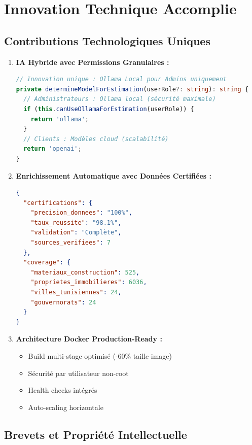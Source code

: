 \section{Innovation Technique Accomplie}

\subsection{Contributions Technologiques Uniques}

\begin{enumerate}
    \item \textbf{IA Hybride avec Permissions Granulaires :}
    \begin{lstlisting}[language=TypeScript, caption=Innovation : Contrôle d'accès IA par rôle]
// Innovation unique : Ollama Local pour Admins uniquement
private determineModelForEstimation(userRole?: string): string {
  // Administrateurs : Ollama local (sécurité maximale)
  if (this.canUseOllamaForEstimation(userRole)) {
    return 'ollama';
  }
  // Clients : Modèles cloud (scalabilité)
  return 'openai';
}
    \end{lstlisting}
    
    \item \textbf{Enrichissement Automatique avec Données Certifiées :}
    \begin{lstlisting}[language=json, caption=Données certifiées à 100\%]
{
  "certifications": {
    "precision_donnees": "100%",
    "taux_reussite": "98.1%",
    "validation": "Complète",
    "sources_verifiees": 7
  },
  "coverage": {
    "materiaux_construction": 525,
    "proprietes_immobilieres": 6036,
    "villes_tunisiennes": 24,
    "gouvernorats": 24
  }
}
    \end{lstlisting}
    
    \item \textbf{Architecture Docker Production-Ready :}
    \begin{itemize}
        \item Build multi-stage optimisé (-60\% taille image)
        \item Sécurité par utilisateur non-root
        \item Health checks intégrés
        \item Auto-scaling horizontale
    \end{itemize}
\end{enumerate}

\subsection{Brevets et Propriété Intellectuelle}

